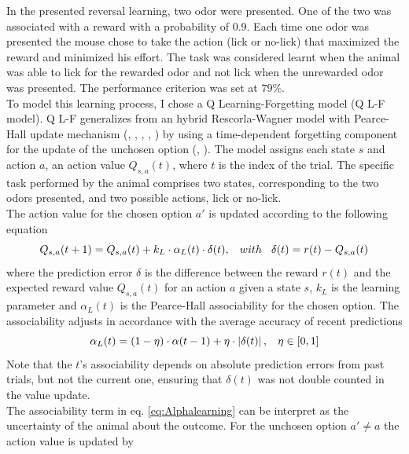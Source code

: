 In the presented reversal learning, two odor were presented. One of the two was associated with a reward with a probability of 0.9. Each time one odor was presented the mouse chose to take the action (lick or no-lick) that maximized the reward and minimized his effort. The task was considered learnt when the animal was able to lick for the rewarded odor and not lick when the unrewarded odor was presented. The performance criterion was set at $79\%$.\\To model this learning process, I chose a Q Learning-Forgetting model (Q L-F model). Q L-F generalizes from an hybrid Rescorla-Wagner model with Pearce-Hall update mechanism (\cite{RescorlaWagner}, \cite{PearceHall}, \cite{Li}, \cite{Costa}, \cite{Koppe}) by using a time-dependent forgetting component for the update of the unchosen option (\cite{ItoDoya1}, \cite{Katahira}).
The model assigns each state $s$ and action $a$, an action value $Q_{s,a}(t)$, where $t$ is the index of the trial. The specific task performed by the animal comprises two states, corresponding to the two odors presented, and two possible actions, lick or no-lick.\\The action value for the chosen option $a'$ is updated according to the following equation
\begin{equation}
Q_{s,a}(t+1)  = Q_{s,a}(t)+k_L\cdot\alpha_L(t)\cdot\delta(t), \hspace{0.3cm} with \hspace{0.3cm}\delta(t)=r(t)-Q_{s,a}(t)
\label{eq:Qlearning}
\end{equation}
where the prediction error $\delta$ is the difference between the reward $r(t)$ and the expected reward value $Q_{s,a}(t)$ for an action $a$ given a state $s$, $k_L$ is the learning parameter and $\alpha_L(t)$ is the Pearce-Hall associability for the chosen option. The associability adjusts in accordance with the average accuracy of recent predictions
\begin{equation}
   \alpha_L(t)=(1-\eta)\cdot\alpha(t-1)+\eta\cdot\left\lvert\delta(t)\right\rvert,\hspace{0.3cm} \eta\in[0,1]
    \label{eq:Alphalearning}
\end{equation}
Note that the $t$'s associability depends on absolute prediction errors from past trials, but not the current one, ensuring that $\delta(t)$ was not double counted in the value update.\\The associability term in eq. \ref{eq:Alphalearning} can be interpret as the uncertainty of the animal about the outcome. 
For the unchosen option $a'\neq a$ the action value is updated by
